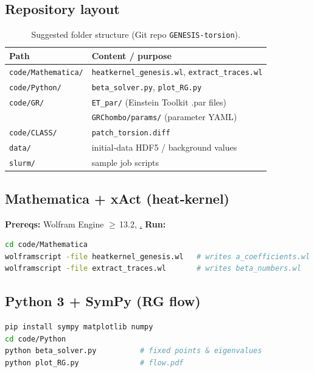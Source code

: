 \documentclass{article}
\begin{document}
\subsection{Repository layout}
\begin{table}[h]
\centering
\begin{tabular}{@{}ll@{}}
\toprule
\textbf{Path} & \textbf{Content / purpose} \\ \midrule
\texttt{code/Mathematica/} & \texttt{heatkernel\_genesis.wl}, \texttt{extract\_traces.wl} \\
\texttt{code/Python/}      & \texttt{beta\_solver.py}, \texttt{plot\_RG.py}               \\
\texttt{code/GR/}          & \texttt{ET\_par/} (Einstein Toolkit .par files)              \\
                           & \texttt{GRChombo/params/} (parameter YAML)                   \\
\texttt{code/CLASS/}       & \texttt{patch\_torsion.diff}                                 \\
\texttt{data/}             & initial‑data HDF5 / background values                       \\
\texttt{slurm/}            & sample job scripts                                           \\ \bottomrule
\end{tabular}
\caption{Suggested folder structure (Git repo \texttt{GENESIS‑torsion}).}
\label{tab:repo}
\end{table}

\subsection*{Mathematica + xAct (heat‑kernel)}
\textbf{Prereqs:} Wolfram Engine $\ge$ 13.2, \href{https://www.xact.es}.  
\textbf{Run:}
\begin{lstlisting}[language=bash,basicstyle=\ttfamily\small]
cd code/Mathematica
wolframscript -file heatkernel_genesis.wl   # writes a_coefficients.wl
wolframscript -file extract_traces.wl       # writes beta_numbers.wl
\end{lstlisting}


\subsection*{Python 3 + SymPy (RG flow)}
\begin{lstlisting}[language=bash,basicstyle=\ttfamily\small]
pip install sympy matplotlib numpy
cd code/Python
python beta_solver.py          # fixed points & eigenvalues
python plot_RG.py              # flow.pdf
\end{lstlisting}              
\end{document}
